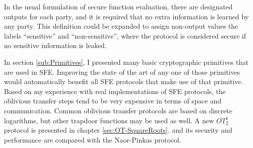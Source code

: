 \label{sub:Other-Optimizations}

In the usual formulation of secure function evaluation, there are
designated outputs for each party, and it is required that no extra
information is learned by any party. This definition could be expanded
to assign non-output values the labels {}``sensitive'' and {}``non-sensitive'',
where the protocol is considered secure if no sensitive information
is leaked. %


In section \ref{sub:Primitives}, I presented many basic cryptographic
primitives that are used in SFE. Improving the state of the art of
any one of those primitives would automatically benefit all SFE protocols
that make use of that primitive. Based on my experience with real
implementations of SFE protocols, the oblivious transfer steps tend
to be very expensive in terms of space and communication. Common oblivious
transfer protocols are based on discrete logarithms, but other trapdoor
functions may be used as well. %
A new $OT_{2}^{1}$ protocol is presented in chapter \ref{sec:OT-SquareRoots}.
and its security and performance are compared with the Naor-Pinkas
protocol. %


